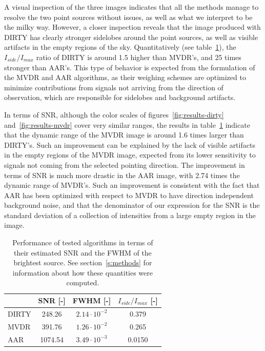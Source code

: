 \documentclass[11pt]{article}
\begin{document}
A visual inspection of the three images indicates that all the methods manage to resolve the two point sources without issues, as well as what we interpret to be the milky way.
However, a closer inspection reveals that the image produced with DIRTY has clearly stronger sidelobes around the point sources, as well as visible artifacts in the empty regions of the sky.
Quantitatively (see table~\ref{tab:results:metrics}), the $I_{side}/I_{max}$ ratio of DIRTY is around 1.5 higher than MVDR's, and 25 times stronger than AAR's.
This type of behavior is expected from the formulation of the MVDR and AAR algorithms, as their weighing schemes are optimized to minimize contributions from signals not arriving from the direction of observation, which are responsible for sidelobes and background artifacts.

In terms of SNR, although the color scales of figures~\ref{fig:results-dirty} and~\ref{fig:results-mvdr} cover very similar ranges, the results in table~\ref{tab:results:metrics} indicate that the dynamic range of the MVDR image is around 1.6 times larger than DIRTY's.
Such an improvement can be explained by the lack of visible artifacts in the empty regions of the MVDR image, expected from its lower sensitivity to signals not coming from the selected pointing direction.
The improvement in terms of SNR is much more drastic in the AAR image, with 2.74 times the dynamic range of MVDR's.
Such an improvement is consistent with the fact that AAR has been optimized with respect to MVDR to have direction independent background noise, and that the denominator of our expression for the SNR is the standard deviation of a collection of intensities from a large empty region in the image.

\begin{table}[!ht]
    \centering
    \caption{Performance of tested algorithms in terms of their estimated SNR and the FWHM of the brightest source. See section~\ref{s:methods} for information about how these quantities were computed.}
    \begin{tabular}{lccc}
        & SNR [-] & FWHM [-] & $I_{side}/I_{max}$ [-] \\
        \hline
        \hline
        DIRTY & 248.26 & $2.14\cdot 10^{-2}$ & 0.379 \\
        MVDR & 391.76 & $1.26\cdot 10^{-2}$ & 0.265 \\
        AAR & 1074.54 & $3.49\cdot 10^{-3}$ & 0.0150 \\
        \hline
    \end{tabular}
    \label{tab:results:metrics}
\end{table}
\end{document}
